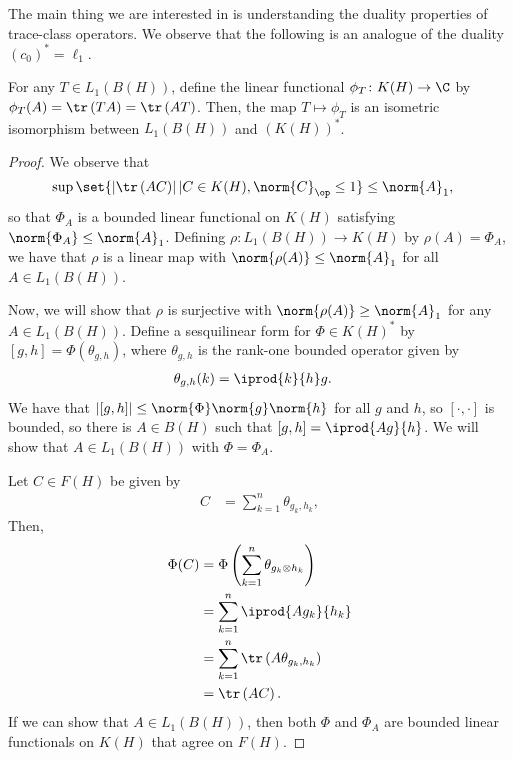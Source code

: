 \documentclass[10pt]{mypackage}
\begin{document}
The main thing we are interested in is understanding the duality properties of trace-class operators. We observe that the following is an analogue of the duality $\left( c_0 \right)^{\ast} = \ell_1$.
\begin{theorem}
  For any $T\in L_1\left( B(H) \right)$, define the linear functional $\phi_T\colon K(H)\rightarrow \C$ by $\phi_T(A) = \tr\left( TA \right) = \tr\left( AT \right)$. Then, the map $T\mapsto \phi_T$ is an isometric isomorphism between $L_1\left( B(H) \right)$ and $\left( K(H) \right)^{\ast}$.
\end{theorem}
\begin{proof}
  We observe that
  \begin{align*}
    \sup\set{\left\vert \tr\left( AC \right) \right\vert | C\in K(H),\norm{C}_{\op}\leq 1} &\leq \norm{A}_{1},
  \end{align*}
  so that $\Phi_A$ is a bounded linear functional on $K(H)$ satisfying $\norm{\Phi_A} \leq \norm{A}_{1}$. Defining $\rho\colon L_1\left( B(H) \right)\rightarrow K(H)$ by $\rho(A) = \Phi_A$, we have that $\rho$ is a linear map with $\norm{\rho(A)}\leq \norm{A}_{1}$ for all $A\in L_1\left( B(H) \right)$.

  Now, we will show that $\rho$ is surjective with $\norm{\rho(A)}\geq \norm{A}_{1}$ for any $A\in L_1\left( B(H) \right)$. Define a sesquilinear form for $\Phi\in K(H)^{\ast}$ by $\left[ g,h \right] = \Phi\left( \theta_{g,h} \right)$, where $\theta_{g,h}$ is the rank-one bounded operator given by
  \begin{align*}
    \theta_{g,h}(k) &= \iprod{k}{h}g.
  \end{align*}
  We have that $\left\vert \left[ g,h \right] \right\vert\leq \norm{\Phi}\norm{g}\norm{h}$ for all $g$ and $h$, so $\left[ \cdot,\cdot \right]$ is bounded, so there is $A\in B(H)$ such that $\left[ g,h \right] = \iprod{Ag}{h}$. We will show that $A\in L_1\left( B(H) \right)$ with $\Phi = \Phi_A$.

  Let $C\in F(H)$ be given by
  \begin{align*}
    C &= \sum_{k=1}^{n}\theta_{g_k,h_k},
  \end{align*}
  Then,
  \begin{align*}
    \Phi(C) &= \Phi\left( \sum_{k=1}^{n}\theta_{g_k\otimes h_k} \right)\\
            &= \sum_{k=1}^{n} \iprod{Ag_k}{h_k}\\
            &= \sum_{k=1}^{n} \tr\left( A\theta_{g_k,h_k} \right)\\
            &= \tr\left( AC \right).
  \end{align*}
  If we can show that $A\in L_1\left( B(H) \right)$, then both $\Phi$ and $\Phi_A$ are bounded linear functionals on $K(H)$ that agree on $F(H)$.


\end{proof}
\end{document}
